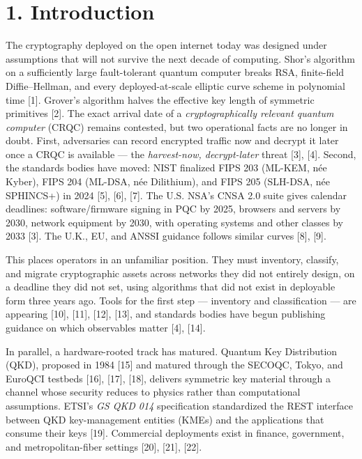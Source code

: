 \section{1. Introduction}\label{introduction}

The cryptography deployed on the open internet today was designed under
assumptions that will not survive the next decade of computing. Shor's
algorithm on a sufficiently large fault-tolerant quantum computer breaks
RSA, finite-field Diffie--Hellman, and every deployed-at-scale elliptic
curve scheme in polynomial time {[}1{]}. Grover's algorithm halves the
effective key length of symmetric primitives {[}2{]}. The exact arrival
date of a \emph{cryptographically relevant quantum computer} (CRQC)
remains contested, but two operational facts are no longer in doubt.
First, adversaries can record encrypted traffic now and decrypt it later
once a CRQC is available --- the \emph{harvest-now, decrypt-later}
threat {[}3{]}, {[}4{]}. Second, the standards bodies have moved: NIST
finalized FIPS 203 (ML-KEM, née Kyber), FIPS 204 (ML-DSA, née
Dilithium), and FIPS 205 (SLH-DSA, née SPHINCS+) in 2024 {[}5{]},
{[}6{]}, {[}7{]}. The U.S. NSA's CNSA 2.0 suite gives calendar
deadlines: software/firmware signing in PQC by 2025, browsers and
servers by 2030, network equipment by 2030, with operating systems and
other classes by 2033 {[}3{]}. The U.K., EU, and ANSSI guidance follows
similar curves {[}8{]}, {[}9{]}.

This places operators in an unfamiliar position. They must inventory,
classify, and migrate cryptographic assets across networks they did not
entirely design, on a deadline they did not set, using algorithms that
did not exist in deployable form three years ago. Tools for the first
step --- inventory and classification --- are appearing {[}10{]},
{[}11{]}, {[}12{]}, {[}13{]}, and standards bodies have begun publishing
guidance on which observables matter {[}4{]}, {[}14{]}.

In parallel, a hardware-rooted track has matured. Quantum Key
Distribution (QKD), proposed in 1984 {[}15{]} and matured through the
SECOQC, Tokyo, and EuroQCI testbeds {[}16{]}, {[}17{]}, {[}18{]},
delivers symmetric key material through a channel whose security reduces
to physics rather than computational assumptions. ETSI's \emph{GS QKD
014} specification standardized the REST interface between QKD
key-management entities (KMEs) and the applications that consume their
keys {[}19{]}. Commercial deployments exist in finance, government, and
metropolitan-fiber settings {[}20{]}, {[}21{]}, {[}22{]}.

